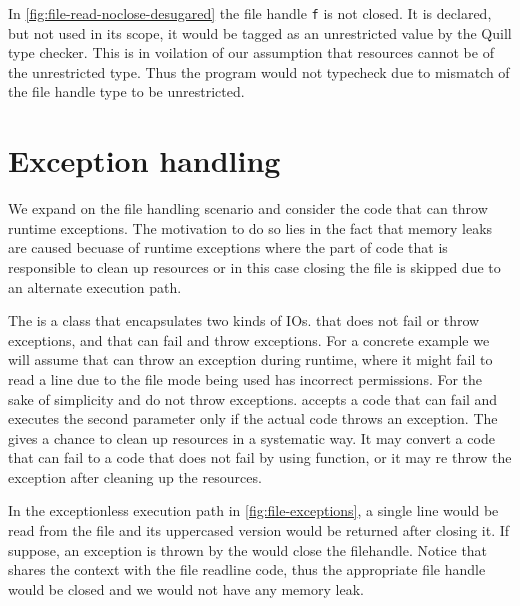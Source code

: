 In \cref{fig:file-read-noclose-desugared} the file handle \texttt{f} is not closed. It is declared, but not used
in its scope, it would be tagged as an unrestricted value by the Quill type checker.
This is in voilation of our assumption that resources cannot be of the unrestricted type. Thus
the program would not typecheck due to mismatch of the file handle type to be unrestricted.

\section{Exception handling}
We expand on the file handling scenario and consider the code that can throw runtime exceptions.
The motivation to do so lies in the fact that memory leaks are caused becuase of runtime
exceptions where the part of code that is responsible to clean up resources or in this case
closing the file is skipped due to an alternate execution path.

The  is a class that encapsulates two kinds of IOs.  that does not fail
or throw exceptions, and  that can fail and throw exceptions.
For a concrete example we will assume that  can throw an exception during runtime, where
it might fail to read a line due to the file mode being used has incorrect permissions.
For the sake of simplicity  and  do not throw exceptions.
 accepts a code that can fail and executes the second
parameter only if the actual code throws an exception. The  gives a chance
to clean up resources in a systematic way. It may convert a code that can fail to a code
that does not fail by using  function, or it may re throw the exception after
cleaning up the resources.

In the exceptionless execution path in \cref{fig:file-exceptions}, a single line would be read from the file and its uppercased
version would be returned after closing it. If suppose, an exception is thrown by 
the  would close the filehandle. Notice that 
shares the context with the file readline code, thus the appropriate file handle would be closed and
we would not have any memory leak.

